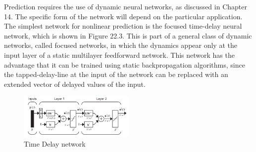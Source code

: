 
\label{subsec:ANN:TDNN}

Prediction requires the use of dynamic neural networks, as discussed in
Chapter 14. The specific form of the network will depend on the particular
application. The simplest network for nonlinear prediction is the focused
time-delay neural network, which is shown in Figure 22.3. This is part of a
general class of dynamic networks, called focused networks, in which the
dynamics appear only at the input layer of a static multilayer feedforward
network. This network has the advantage that it can be trained using static
backpropagation algorithms, since the tapped-delay-line at the input of the
network can be replaced with an extended vector of delayed values of the
input.

\begin{figure}[!ht]
\centering
\includegraphics[width=0.5\textwidth]{images/tdnn.png}
\caption{Time Delay network}
\label{fig:tdnn}
\end{figure}
